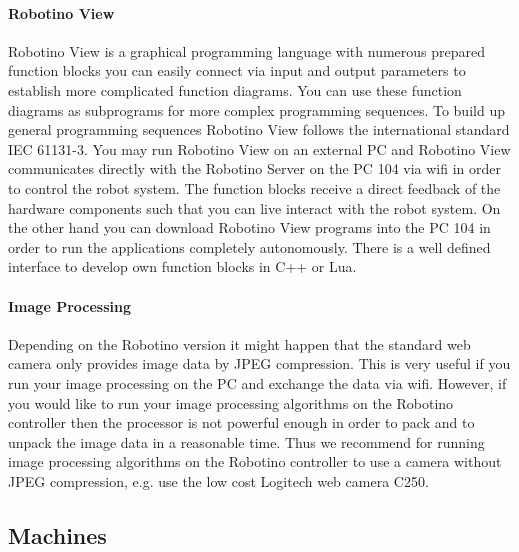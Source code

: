 \documentclass[12pt,twoside]{article}
\begin{document}
\begin{appendix}
\paragraph{Robotino View} 

Robotino View is a graphical programming language with numerous
prepared function blocks you can easily connect via input and output
parameters to establish more complicated function diagrams. You can use
these function diagrams as subprograms for more complex programming
sequences. To build up general programming sequences Robotino View
follows the international standard IEC 61131-3. You may run Robotino
View on an external PC and Robotino View communicates directly with
the Robotino Server on the PC 104 via wifi in order to control the
robot system. The function blocks receive a direct feedback of the
hardware components such that you can live interact with the robot
system. On the other hand you can download Robotino View programs into
the PC 104 in order to run the applications completely autonomously.
There is a well defined interface to develop own function blocks in C++
or Lua.

\paragraph{Image Processing}

Depending on the Robotino version it might happen that the standard web
camera only provides image data by JPEG compression. This is very
useful if you run your image processing on the PC and exchange the data
via wifi. However, if you would like to run your image processing
algorithms on the Robotino controller then the processor is not
powerful enough in order to pack and to unpack the image data in a
reasonable time. Thus we recommend for running image processing
algorithms on the Robotino controller to use a camera without JPEG
compression, e.g. use the low cost Logitech web camera C250.

\subsection{Machines}
\label{abx:sec:machine}


\end{appendix}
\end{document}
